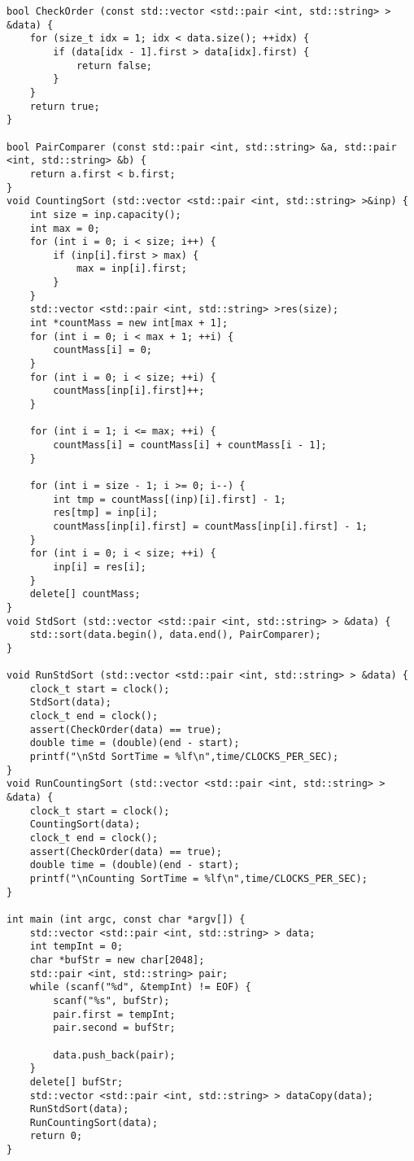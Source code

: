 \documentclass[pdf, unicode, 12pt, a4paper,oneside,fleqn]{article}
\begin{document}
\begin{itemize}
\begin{lstlisting}
bool CheckOrder (const std::vector <std::pair <int, std::string> > &data) {
    for (size_t idx = 1; idx < data.size(); ++idx) {
        if (data[idx - 1].first > data[idx].first) {
            return false;
        }
    }
    return true;
}

bool PairComparer (const std::pair <int, std::string> &a, std::pair <int, std::string> &b) {
    return a.first < b.first;
}
void CountingSort (std::vector <std::pair <int, std::string> >&inp) {
    int size = inp.capacity();
    int max = 0;
    for (int i = 0; i < size; i++) {
        if (inp[i].first > max) {
            max = inp[i].first;
        }
    }
    std::vector <std::pair <int, std::string> >res(size);
    int *countMass = new int[max + 1];
    for (int i = 0; i < max + 1; ++i) {
        countMass[i] = 0;
    }
    for (int i = 0; i < size; ++i) {
        countMass[inp[i].first]++;
    }

    for (int i = 1; i <= max; ++i) {
        countMass[i] = countMass[i] + countMass[i - 1];
    }

    for (int i = size - 1; i >= 0; i--) {
        int tmp = countMass[(inp)[i].first] - 1;
        res[tmp] = inp[i];
        countMass[inp[i].first] = countMass[inp[i].first] - 1;
    }
    for (int i = 0; i < size; ++i) {
        inp[i] = res[i];
    }
    delete[] countMass;
}
void StdSort (std::vector <std::pair <int, std::string> > &data) {
    std::sort(data.begin(), data.end(), PairComparer);
}

void RunStdSort (std::vector <std::pair <int, std::string> > &data) {
    clock_t start = clock();
    StdSort(data);
    clock_t end = clock();
    assert(CheckOrder(data) == true);
    double time = (double)(end - start);
    printf("\nStd SortTime = %lf\n",time/CLOCKS_PER_SEC);
}
void RunCountingSort (std::vector <std::pair <int, std::string> > &data) {
    clock_t start = clock();
    CountingSort(data);
    clock_t end = clock();
    assert(CheckOrder(data) == true);
    double time = (double)(end - start);
    printf("\nCounting SortTime = %lf\n",time/CLOCKS_PER_SEC);
}

int main (int argc, const char *argv[]) {
    std::vector <std::pair <int, std::string> > data;
    int tempInt = 0;
    char *bufStr = new char[2048];
    std::pair <int, std::string> pair;
    while (scanf("%d", &tempInt) != EOF) {
        scanf("%s", bufStr);
        pair.first = tempInt;
        pair.second = bufStr;

        data.push_back(pair);
    }
    delete[] bufStr;
    std::vector <std::pair <int, std::string> > dataCopy(data);
    RunStdSort(data);
    RunCountingSort(data);
    return 0;
}

\end{lstlisting}

\end{itemize}
\newpage
\end{document}
